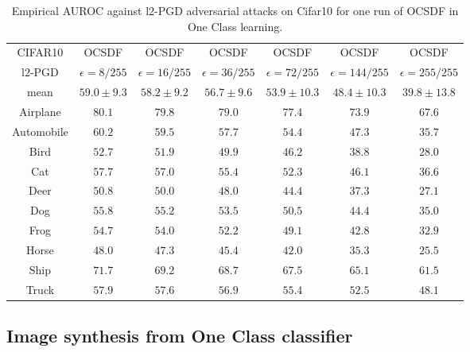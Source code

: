 \begin{table}%
    \centering
    \small
    \begin{tabular}{|c|cccccc|}
    \hline
      CIFAR10 & OCSDF & OCSDF & OCSDF & OCSDF & OCSDF & OCSDF \\
      l$2$-PGD & $\epsilon=8/255$ & $\epsilon=16/255$ & $\epsilon=36/255$ & $\epsilon=72/255$ & $\epsilon=144/255$ & $\epsilon=255/255$\\
    \hline
    \hline
    mean & $59.0\pm 9.3$ & $58.2\pm 9.2$ & $56.7\pm 9.6$ & $53.9\pm 10.3$ & $48.4\pm 10.3$ & $39.8\pm 13.8$\\
    \hline
    Airplane & $80.1$ & $79.8$ & $79.0$ & $77.4$ & $73.9$ & $67.6$\\
    Automobile & $60.2$ & $59.5$ & $57.7$ & $54.4$ & $47.3$ & $35.7$\\
    Bird & $52.7$ & $51.9$ & $49.9$ & $46.2$ & $38.8$ & $28.0$\\
    Cat & $57.7$ & $57.0$ & $55.4$ & $52.3$ & $46.1$ & $36.6$\\
    Deer & $50.8$ & $50.0$ & $48.0$ & $44.4$ & $37.3$ & $27.1$\\
    Dog & $55.8$ & $55.2$ & $53.5$ & $50.5$ & $44.4$ & $35.0$\\
    Frog & $54.7$ & $54.0$ & $52.2$ & $49.1$ & $42.8$ & $32.9$\\
    Horse & $48.0$ & $47.3$ & $45.4$ & $42.0$ & $35.3$ & $25.5$\\
    Ship & $71.7$ & $69.2$ & $68.7$ & $67.5$ & $65.1$ & $61.5$\\
    Truck & $57.9$ & $57.6$ & $56.9$ & $55.4$ & $52.5$ & $48.1$\\
    \hline
    \end{tabular}
    \caption{Empirical AUROC against l$2$-PGD adversarial attacks on Cifar10 for one run of OCSDF in One Class learning.}
    \label{tab:empiricalOCSDFcifar10}
\end{table}

\subsection{Image synthesis from One Class classifier}


